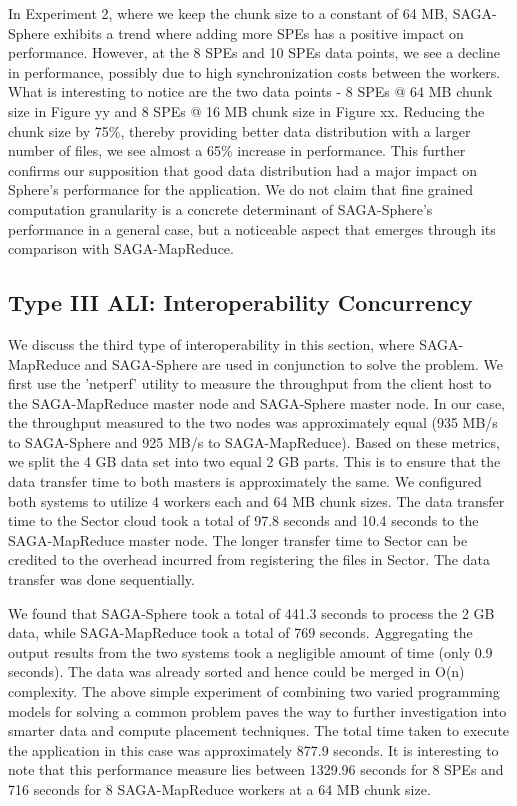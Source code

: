 \documentclass[3p,twocolumn]{elsarticle}
\begin{document}
In Experiment 2, where we keep the chunk size to a constant of 64 MB, SAGA-Sphere 
exhibits a trend where adding more SPEs has a positive impact on performance. However, 
at the 8 SPEs and 10 SPEs data points, we see a decline in performance, possibly 
due to high synchronization costs between the workers. What is interesting to 
notice are the two data points - 8 SPEs @ 64 MB chunk size in Figure yy 
and 8 SPEs @ 16 MB chunk size in Figure xx. Reducing the chunk size by 75\%, 
thereby providing better data distribution with a larger number of files, we 
see almost a 65\% increase in performance. This further confirms our 
supposition that good data distribution had a major impact on Sphere's performance for
the \wc application. We do not claim that fine grained computation 
granularity is a concrete determinant of SAGA-Sphere's performance in a 
general case, but a noticeable aspect that emerges through its comparison with SAGA-MapReduce. 


\subsection{Type III ALI: Interoperability Concurrency}

We discuss the third type of interoperability in this section,
where SAGA-MapReduce and SAGA-Sphere are used in conjunction 
to solve the \wc problem. We first use the 'netperf' 
utility to measure the throughput from the client host to 
the SAGA-MapReduce master node and SAGA-Sphere master node. 
In our case, the throughput measured to the two nodes was 
approximately equal (935 MB/s to SAGA-Sphere and 925 MB/s to SAGA-MapReduce). 
Based on these metrics, we split the 4 GB data set 
into two equal 2 GB parts. This is to ensure that the data 
transfer time to both masters is approximately the same. We 
configured both systems to utilize 4 workers each 
and 64 MB chunk sizes. The data transfer time to the Sector 
cloud took a total of 97.8 seconds and 10.4 seconds to the 
SAGA-MapReduce master node. The longer transfer time to Sector 
can be credited to the overhead incurred from registering 
the files in Sector. The data transfer was done sequentially. 

We found that SAGA-Sphere took a total of 441.3 seconds to 
process the 2 GB data, while SAGA-MapReduce took a total of 
769 seconds. Aggregating the output results from the two systems 
took a negligible amount of time (only 0.9 seconds). The data was 
already sorted and hence could be merged in O(n) complexity. 
The above simple experiment of combining two varied programming 
models for solving a common problem paves the way to further 
investigation into smarter data and compute placement techniques. 
The total time taken to execute the \wc application in this 
case was approximately 877.9 seconds. It is interesting to 
note that this performance measure lies between 1329.96 seconds 
for 8 SPEs and 716 seconds for 8 SAGA-MapReduce workers at 
a 64 MB chunk size. 
\end{document}
